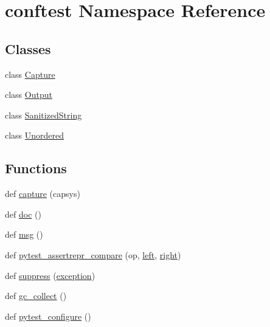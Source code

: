 \hypertarget{namespaceconftest}{}\section{conftest Namespace Reference}
\label{namespaceconftest}
\subsection*{Classes}
\begin{DoxyCompactItemize}
\item 
class \mbox{\hyperlink{classconftest_1_1_capture}{Capture}}
\item 
class \mbox{\hyperlink{classconftest_1_1_output}{Output}}
\item 
class \mbox{\hyperlink{classconftest_1_1_sanitized_string}{Sanitized\+String}}
\item 
class \mbox{\hyperlink{classconftest_1_1_unordered}{Unordered}}
\end{DoxyCompactItemize}
\subsection*{Functions}
\begin{DoxyCompactItemize}
\item 
def \mbox{\hyperlink{namespaceconftest_aad7bbb453045d1770805438a473317a4}{capture}} (capsys)
\item 
def \mbox{\hyperlink{namespaceconftest_a35de28597d48d0a25c748a140765032e}{doc}} ()
\item 
def \mbox{\hyperlink{namespaceconftest_a8232d5538ccdf81352ae8d484548864e}{msg}} ()
\item 
def \mbox{\hyperlink{namespaceconftest_ae323d6c25dca1e94101a23a65a3b2ba5}{pytest\+\_\+assertrepr\+\_\+compare}} (op, \mbox{\hyperlink{_s_d_l__opengl__glext_8h_a85b8f6c07fbc1fb5d77c2ae090f21995}{left}}, \mbox{\hyperlink{_s_d_l__opengl__glext_8h_a5ffadbbacc6b89cf6218bc43b384d3fe}{right}})
\item 
def \mbox{\hyperlink{namespaceconftest_a91c661a91528bcb9b6c5f6acbc7f6558}{suppress}} (\mbox{\hyperlink{classexception}{exception}})
\item 
def \mbox{\hyperlink{namespaceconftest_ae5bb8caa851371d0b8576827a6a20f0f}{gc\+\_\+collect}} ()
\item 
def \mbox{\hyperlink{namespaceconftest_abf6aaa58b0abe123198ba68fb26350d5}{pytest\+\_\+configure}} ()
\end{DoxyCompactItemize}


